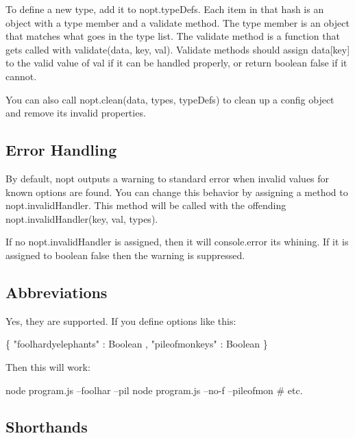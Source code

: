 To define a new type, add it to {\ttfamily nopt.\+type\+Defs}. Each item in that hash is an object with a {\ttfamily type} member and a {\ttfamily validate} method. The {\ttfamily type} member is an object that matches what goes in the type list. The {\ttfamily validate} method is a function that gets called with {\ttfamily validate(data, key, val)}. Validate methods should assign {\ttfamily data\mbox{[}key\mbox{]}} to the valid value of {\ttfamily val} if it can be handled properly, or return boolean {\ttfamily false} if it cannot.

You can also call {\ttfamily nopt.\+clean(data, types, type\+Defs)} to clean up a config object and remove its invalid properties.

\subsection*{Error Handling}

By default, nopt outputs a warning to standard error when invalid values for known options are found. You can change this behavior by assigning a method to {\ttfamily nopt.\+invalid\+Handler}. This method will be called with the offending {\ttfamily nopt.\+invalid\+Handler(key, val, types)}.

If no {\ttfamily nopt.\+invalid\+Handler} is assigned, then it will console.\+error its whining. If it is assigned to boolean {\ttfamily false} then the warning is suppressed.

\subsection*{Abbreviations}

Yes, they are supported. If you define options like this\+:


\begin{DoxyCode}
\{ "foolhardyelephants" : Boolean
, "pileofmonkeys" : Boolean \}
\end{DoxyCode}


Then this will work\+:


\begin{DoxyCode}
node program.js --foolhar --pil
node program.js --no-f --pileofmon
# etc.
\end{DoxyCode}


\subsection*{Shorthands}

